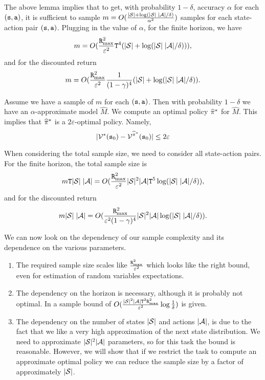 The above lemma implies that to get, with probability $1-\delta$,
accuracy $\alpha$ for each $({\tt s},{\tt a})$, it is sufficient to
sample $m=O(\frac{|\mathcal{S}| +
\log(|\mathcal{S}|\;|\mathcal{A}|/\delta)}{\alpha^2} )$ samples for each
state-action pair $({\tt s},{\tt a})$. Plugging in the value of
$\alpha$, for the finite horizon, we have
\[
m=O(\frac{{\tt R}_{\max }^2}{\varepsilon^2} {\tt T}^4 (|\mathcal{S}|+\log
(|\mathcal{S}|\;|\mathcal{A}|/\delta))),
\]
and for the discounted return
\[
m=O(\frac{{\tt R}_{\max }^2}{\varepsilon^2}  \frac{1}{(1-\gamma)^4}
(|\mathcal{S}|+\log (|\mathcal{S}|\;|\mathcal{A}|/\delta)).
\]


Assume we have a sample of $m$ for each $({\tt s},{\tt a})$. Then
with probability $1-\delta$ we have an $\alpha$-approximate model
$\widehat{M}$.
%
We compute an optimal policy $\widehat{\pi}^*$ for
$\widehat{M}$.
%
This implies that $\widehat{\pi}^*$ is a $2\varepsilon$-optimal
policy. Namely,
\[
|\mathcal{V}^*({\tt s}_0)-\mathcal{V}^{\widehat{\pi}^*}({\tt s}_0)|\leq
2\varepsilon
\]


When considering the total sample size, we need to consider all
state-action pairs. For the finite horizon, the total sample size is
\[
m{\tt T}|\mathcal{S}|\;|\mathcal{A}|=O(\frac{{\tt R}_{\max }^2}{\varepsilon^2}
|\mathcal{S}|^2 |\mathcal{A}| {\tt T}^5 \log
(|\mathcal{S}|\;|\mathcal{A}|/\delta)),
\]
and for the discounted return
\[
m|\mathcal{S}|\;|\mathcal{A}|=O(\frac{{\tt R}_{\max }^2}{\varepsilon^2(1-\gamma)^4} |\mathcal{S}|^2 |\mathcal{A}|  \log(|\mathcal{S}|\;|\mathcal{A}|/\delta)).
\]

We can now look on the dependency of our sample complexity and its
dependence on the various parameters.

\begin{enumerate}
\item
The required sample size scales like $\frac{{\tt R}_{\max }^2}{\varepsilon^2}$ which looks
like the right bound, even for estimation of random variables
expectations.
\item
The dependency on the horizon is necessary, although it is probably
not optimal. In \cite{DannB15} a sample bound of
$O(\frac{|\mathcal{S}|^2|\mathcal{A}|{\tt T}^2{\tt R}_{\max }^2}{\varepsilon^2}\log\frac{1}{\delta}
)$ is given.
\item
The dependency on the number of states $|\mathcal{S}|$ and
actions $|\mathcal{A}|$, is due to the fact that we like a very high
approximation of the next state distribution. We need to approximate
$|\mathcal{S}|^2|\mathcal{A}|$ parameters, so for this task the bound is
reasonable. However, we will show that if we restrict the task to
compute an approximate optimal policy we can reduce the sample size
by a factor of approximately $|\mathcal{S}|$.
\end{enumerate}

